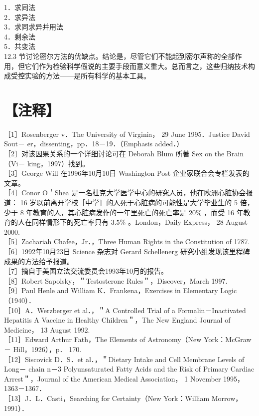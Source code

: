 1．求同法\\
2．求异法\\
3．求同求异并用法\\
4．剩余法\\
5．共变法\\
12.3 节讨论密尔方法的优缺点。结论是，尽管它们不能起到密尔声称的全部作用，但它们作为检验科学假说的主要手段而意义重大。总而言之，这些归纳技术构成受控实验的方法——是所有科学的基本工具。

\section*{【注释】}
［1］Rosenberger v．The University of Virginia， 29 June 1995．Justice David Sout－ er，dissenting，pp．18－19．（Emphasis added．）\\
［2］对该因果关系的一个详细讨论可在 Deborah Blum 所著 Sex on the Brain（Vi－ king，1997）找到。\\
［3］George Will 在1996年10月10日 Washington Post 企业家联合会专栏发表的文章。\\
［4］Conor O＇Shea 是一名杜克大学医学中心的研究人员，他在欧洲心脏协会报道： 16 岁以前离开学校［中学］的人死于心脏病的可能性是大学毕业生的 5 倍，少于 8 年教育的人，其心脏病发作的一年里死亡的死亡率是 $20 \%$ ，而受 16 年教育的人在同样情形下的死亡率只有 $3.5 \%$ 。London，Daily Express， 28 August 2000.\\
［5］Zachariah Chafee，Jr．，Three Human Rights in the Constitution of 1787.\\
［6］1992年10月23日 Science 杂志对 Gerard Schellenerg 研究小组发现该里程碑成果的方法给予报道。\\
［7］摘自于美国立法交流委员会1993年10月的报告。\\
［8］Robert Sapolsky，＂Testosterone Rules＂，Discover，March 1997.\\
［9］Paul Henle and William K．Frankena，Exercises in Elementary Logic（1940）．\\
［10］A．Werzberger et al．，＂A Controlled Trial of a Formalin－Inactivated Hepatitis A Vaccine in Healthy Children＂，The New England Journal of Medicine， 13 August 1992.\\
［11］Edward Arthur Fath，The Elements of Astronomy（New York：McGraw－ Hill，1926），p． 170.\\
［12］Siscovick D．S．et al．，＂Dietary Intake and Cell Membrane Levels of Long－ chain n－3 Polyunsaturated Fatty Acids and the Risk of Primary Cardiac Arrest＂，Journal of the American Medical Association， 1 November 1995，1363－1367．\\
［13］J．L．Casti，Searching for Certainty（New York：William Morrow，1991）．

